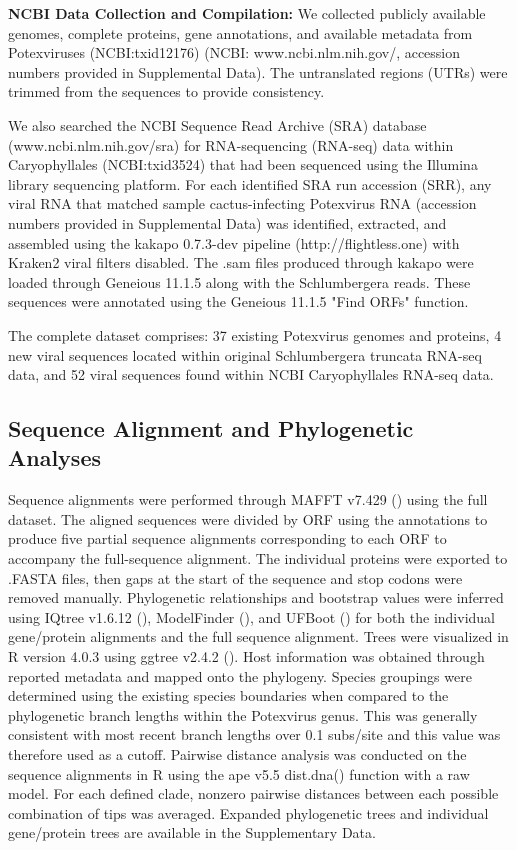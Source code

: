 \documentclass{article}
\begin{document}
\textbf{NCBI Data Collection and Compilation:}
We collected publicly available genomes, complete proteins, gene annotations, and available metadata from Potexviruses (NCBI:txid12176) (NCBI: www.ncbi.nlm.nih.gov/, accession numbers provided in Supplemental Data). 
The untranslated regions (UTRs) were trimmed from the sequences to provide consistency.


We also searched the NCBI Sequence Read Archive (SRA) database (www.ncbi.nlm.nih.gov/sra) for RNA-sequencing (RNA-seq) data within Caryophyllales (NCBI:txid3524) that had been sequenced using the Illumina library sequencing platform. 
For each identified SRA run accession (SRR), any viral RNA that matched sample cactus-infecting Potexvirus RNA (accession numbers provided in Supplemental Data) was identified, extracted, and assembled using the kakapo 0.7.3-dev pipeline (http://flightless.one) with Kraken2 viral filters disabled. 
The .sam files produced through kakapo were loaded through Geneious 11.1.5 along with the Schlumbergera reads.
These sequences were annotated using the Geneious 11.1.5 "Find ORFs" function. 

The complete dataset comprises: 37 existing Potexvirus genomes and proteins, 4 new viral sequences located within original Schlumbergera truncata RNA-seq data, and 52 viral sequences found within NCBI Caryophyllales RNA-seq data.

\subsection*{Sequence Alignment and Phylogenetic Analyses}
Sequence alignments were performed through MAFFT v7.429 (\cite{katoh_mafft_2002}) using the full dataset.
The aligned sequences were divided by ORF using the annotations to produce five partial sequence alignments corresponding to each ORF to accompany the full-sequence alignment. 
The individual proteins were exported to .FASTA files, then gaps at the start of the sequence and stop codons were removed manually. 
Phylogenetic relationships and bootstrap values were inferred using IQtree v1.6.12 (\cite{nguyen_iq-tree_2015}), ModelFinder (\cite{kalyaanamoorthy_modelfinder_2017}), and UFBoot (\cite{hoang_ufboot2_2018}) for both the individual gene/protein alignments and the full sequence alignment. 
Trees were visualized in R version 4.0.3 using ggtree v2.4.2 (\cite{yu_ggtree_2017}). 
Host information was obtained through reported metadata and mapped onto the phylogeny. 
Species groupings were determined using the existing species boundaries when compared to the phylogenetic branch lengths within the Potexvirus genus. 
This was generally consistent with most recent branch lengths over 0.1 subs/site and this value was therefore used as a cutoff. 
Pairwise distance analysis was conducted on the sequence alignments in R using the ape v5.5  dist.dna() function with a raw model. 
For each defined clade, nonzero pairwise distances between each possible combination of tips was averaged. 
Expanded phylogenetic trees and individual gene/protein trees are available in the Supplementary Data.
\end{document}
